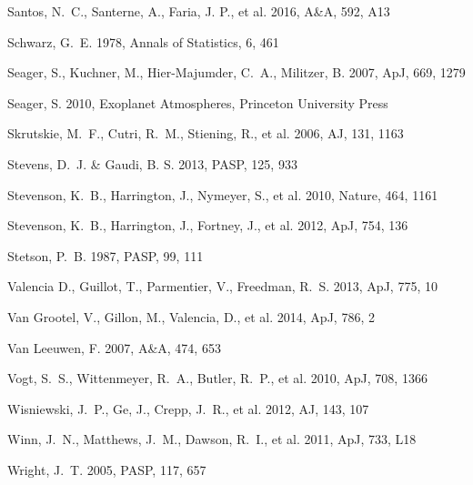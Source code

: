 \documentclass[traditabstract]{aa}
\begin{document}
\begin{thebibliography}{}
 Santos, N.~C., Santerne, A., Faria, J. P., et al. 2016, A\&A, 592, A13
   
  Schwarz, G.~E. 1978, Annals of Statistics, 6, 461

 Seager, S., Kuchner, M., Hier-Majumder, C.~A., Militzer, B. 2007, ApJ, 669, 1279

 Seager, S. 2010, Exoplanet Atmospheres, Princeton University Press
   
 Skrutskie, M.~F., Cutri, R.~M., Stiening, R., et al. 2006, AJ, 131, 1163

 Stevens, D.~J. \& Gaudi, B. S. 2013, PASP, 125, 933
   
 Stevenson, K.~B., Harrington, J., Nymeyer, S., et al. 2010, Nature, 464, 1161
   
 Stevenson, K.~B., Harrington, J., Fortney, J., et al. 2012, ApJ, 754, 136

 Stetson, P.~B. 1987, PASP, 99, 111

 Valencia D., Guillot, T., Parmentier, V., Freedman, R.~S. 2013, ApJ, 775, 10

 Van Grootel, V., Gillon, M., Valencia, D., et al. 2014, ApJ, 786, 2

 Van Leeuwen, F. 2007, A\&A, 474, 653

 Vogt, S.~S., Wittenmeyer, R.~A., Butler, R.~P., et al. 2010, ApJ, 708, 1366

 Wisniewski, J.~P., Ge, J., Crepp, J.~R., et al. 2012, AJ, 143, 107

 Winn, J.~N., Matthews, J.~M., Dawson, R.~I., et al. 2011, ApJ, 733, L18

 Wright, J.~T. 2005, PASP, 117, 657
 
\end{thebibliography}
\end{document}

